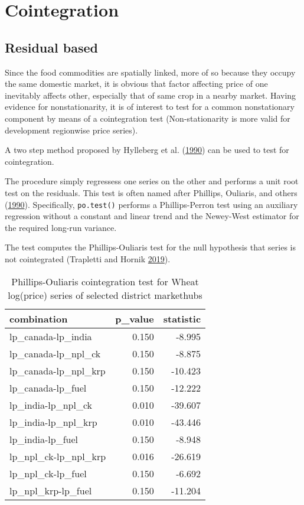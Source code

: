 \documentclass[
  12pt,
]{article}
\begin{document}
\hypertarget{cointegration}{%
\section{Cointegration}\label{cointegration}}

\hypertarget{residual-based}{%
\subsection{Residual based}\label{residual-based}}

Since the food commodities are spatially linked, more of so because they occupy the same domestic market, it is obvious that factor affecting price of one inevitably affects other, especially that of same crop in a nearby market. Having evidence for nonstationarity, it is of interest to test for a common nonstationary component by means of a cointegration test (Non-stationarity is more valid for development regionwise price series).

A two step method proposed by Hylleberg et al. (\protect\hyperlink{ref-hylleberg1990seasonal}{1990}) can be used to test for cointegration.

The procedure simply regressess one series on the other and performs a unit root test on the residuals. This test is often named after Phillips, Ouliaris, and others (\protect\hyperlink{ref-phillips1990asymptotic}{1990}). Specifically, \texttt{po.test()} performs a Phillips-Perron test using an auxiliary regression without a constant and linear trend and the Newey-West estimator for the required long-run variance.

The test computes the Phillips-Ouliaris test for the null hypothesis that series is not cointegrated (Trapletti and Hornik \protect\hyperlink{ref-R-tseries}{2019}).

\begin{longtable}[t]{lrr}
\caption{\label{tab:pairwise-phillips-cointegration}Phillips-Ouliaris cointegration test for Wheat log(price) series of selected district markethubs}\\
\toprule
combination & p\_value & statistic\\
\midrule
lp\_canada-lp\_india & 0.150 & -8.995\\
lp\_canada-lp\_npl\_ck & 0.150 & -8.875\\
lp\_canada-lp\_npl\_krp & 0.150 & -10.423\\
lp\_canada-lp\_fuel & 0.150 & -12.222\\
lp\_india-lp\_npl\_ck & 0.010 & -39.607\\
\addlinespace
lp\_india-lp\_npl\_krp & 0.010 & -43.446\\
lp\_india-lp\_fuel & 0.150 & -8.948\\
lp\_npl\_ck-lp\_npl\_krp & 0.016 & -26.619\\
lp\_npl\_ck-lp\_fuel & 0.150 & -6.692\\
lp\_npl\_krp-lp\_fuel & 0.150 & -11.204\\
\bottomrule
\end{longtable}
\end{document}
